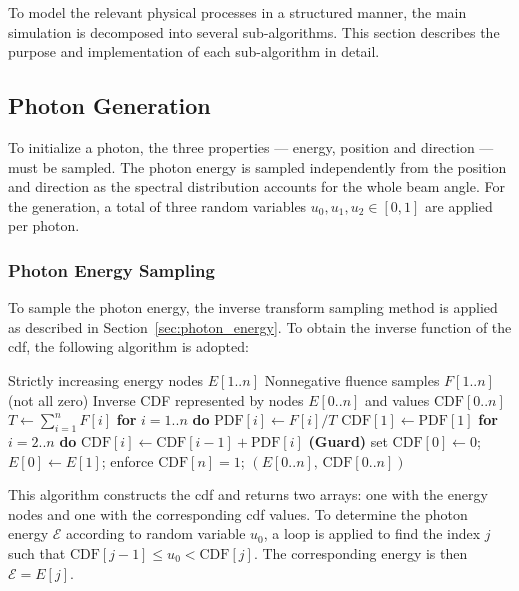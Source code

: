 To model the relevant physical processes in a structured manner, the main
simulation is decomposed into several sub-algorithms. This section describes the
purpose and implementation of each sub-algorithm in detail.

\subsection{Photon Generation}
\label{sec:photonDirectionSampling}

To initialize a photon, the three properties --- energy, position and direction
--- must be sampled. The photon energy is sampled independently from the
position and direction as the spectral distribution accounts for the whole beam
angle. For the generation, a total of three random variables $u_0,u_1,u_2 \in
[0,1]$ are applied per photon.

\subsubsection{Photon Energy Sampling}

To sample the photon energy, the inverse transform sampling method is applied as
described in Section~\ref{sec:photon_energy}. To obtain the inverse function of
the \ac{cdf}, the following algorithm is adopted:

\begin{algorithm}[H]
\caption{Inverse-Determination of the CDF}
\label{alg:photonEnergySampling}
\begin{algorithmic}[1]
\Require Strictly increasing energy nodes $E[1..n]$
\Require Nonnegative fluence samples $F[1..n]$ (not all zero)
\Ensure Inverse CDF represented by nodes $E[0..n]$ and values $\mathrm{CDF}[0..n]$
\State $T \gets \sum_{i=1}^{n} F[i]$ 
\State \textbf{for} $i=1..n$ \textbf{do} $\mathrm{PDF}[i] \gets F[i]/T$
\State $\mathrm{CDF}[1] \gets \mathrm{PDF}[1]$
\State \textbf{for} $i=2..n$ \textbf{do} $\mathrm{CDF}[i] \gets \mathrm{CDF}[i-1]+\mathrm{PDF}[i]$
\State \textbf{(Guard)} set $\mathrm{CDF}[0]\gets 0$; \quad $E[0]\gets E[1]$; \quad enforce $\mathrm{CDF}[n]=1$;
\State \Return $(E[0..n],\,\mathrm{CDF}[0..n])$
\end{algorithmic}
\end{algorithm}

This algorithm constructs the \ac{cdf} and returns two arrays: one with the
energy nodes and one with the corresponding \ac{cdf} values. To determine the
photon energy $\mathcal{E}$ according to random variable $u_0$, a loop is
applied to find the index $j$ such that $\mathrm{CDF}[j-1] \le u_0 <
\mathrm{CDF}[j]$. The corresponding energy is then $\mathcal{E} = E[j]$.

